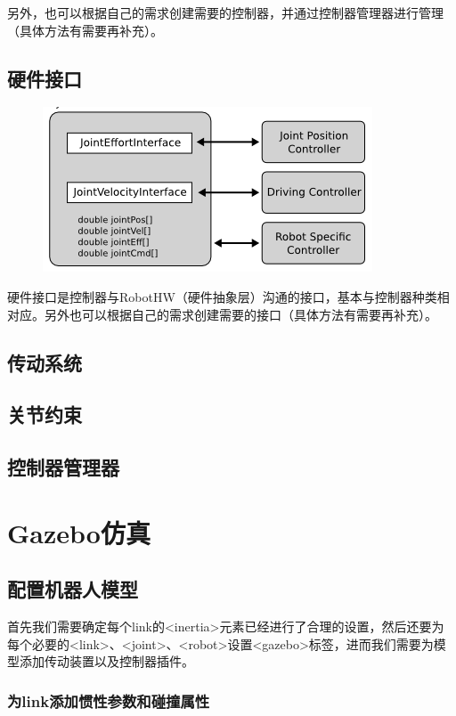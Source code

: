 \documentclass[10pt, oneside]{book}
\begin{document}
另外，也可以根据自己的需求创建需要的控制器，并通过控制器管理器进行管理（具体方法有需要再补充）。

\subsection{硬件接口}

\begin{figure}[H]
    \centering
    \includegraphics[width=0.4\linewidth]{image/硬件接口.png}
\end{figure}

硬件接口是控制器与RobotHW（硬件抽象层）沟通的接口，基本与控制器种类相对应。另外也可以根据自己的需求创建需要的接口（具体方法有需要再补充）。

\subsection{传动系统}

\subsection{关节约束}

\subsection{控制器管理器}

\section{Gazebo仿真}

\subsection{配置机器人模型}

首先我们需要确定每个link的<inertia>元素已经进行了合理的设置，然后还要为每个必要的<link>、<joint>、<robot>设置<gazebo>标签，进而我们需要为模型添加传动装置以及控制器插件。

\subsubsection{为link添加惯性参数和碰撞属性}
\end{document}
